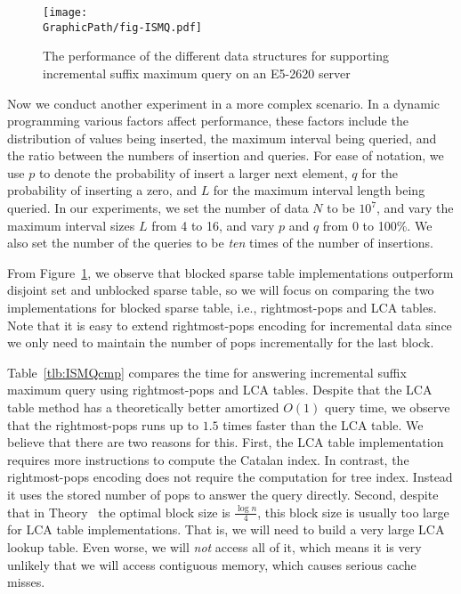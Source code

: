\begin{figure}[!thb]
  \centering
  \texttt{[image: \\GraphicPath/fig-ISMQ.pdf]}
  \caption{The performance of the different data structures for
    supporting incremental suffix maximum query on an E5-2620 server}
  \label{fig:fig-ISMQcmp}
\end{figure}

Now we conduct another experiment in a more complex scenario.  In a
dynamic programming various factors affect performance, these factors
include the distribution of values being inserted, the maximum
interval being queried, and the ratio between the numbers of insertion
and queries.  For ease of notation, we use $p$ to denote the
probability of insert a larger next element, $q$ for the probability
of inserting a zero, and $L$ for the maximum interval length being
queried.  In our experiments, we set the number of data $N$ to be
$10^7$, and vary the maximum interval sizes $L$ from 4 to 16, and vary
$p$ and $q$ from 0 to 100\%.  We also set the number of the queries to
be {\em ten} times of the number of insertions.

From Figure~\ref{fig:fig-ISMQcmp}, we observe that blocked sparse
table implementations outperform disjoint set and unblocked sparse
table, so we will focus on comparing the two implementations for
blocked sparse table, i.e., rightmost-pops and LCA tables.  Note that
it is easy to extend rightmost-pops encoding for incremental data
since we only need to maintain the number of pops incrementally for
the last block.

Table~\ref{tlb:ISMQcmp} compares the time for answering incremental
suffix maximum query using rightmost-pops and LCA tables.  Despite
that the LCA table method has a theoretically better amortized $O(1)$
query time, we observe that the rightmost-pops runs up to $1.5$ times
faster than the LCA table.  We believe that there are two reasons for
this.  First, the LCA table implementation requires more instructions
to compute the Catalan index.  In contrast, the rightmost-pops
encoding does not require the computation for tree index.  Instead it
uses the stored number of pops to answer the query directly.  Second,
despite that in Theory~\cite{Fischer2006TheoreticalAP} the optimal
block size is $\frac{\log n}{4}$, this block size is usually too large
for LCA table implementations.  That is, we will need to build a very
large LCA lookup table.  Even worse, we will {\em not} access all of
it, which means it is very unlikely that we will access contiguous
memory, which causes serious cache misses.



